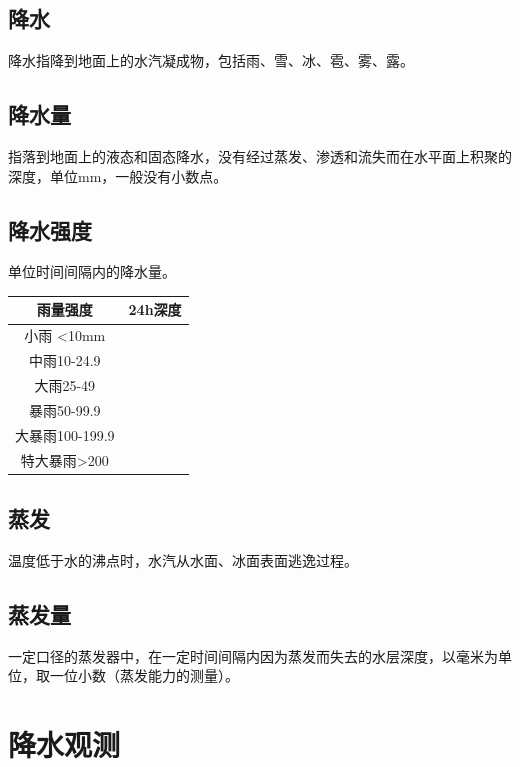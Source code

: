 \documentclass[UTF8,11pt]{ctexbook}
\begin{document}
\subsection{降水}

降水指降到地面上的水汽凝成物，包括雨、雪、冰、雹、雾、露。

\subsection{降水量}

指落到地面上的液态和固态降水，没有经过蒸发、渗透和流失而在水平面上积聚的深度，单位mm，一般没有小数点。

\subsection{降水强度}

单位时间间隔内的降水量。
\begin{table}[htbp]
    \centering
    \begin{tabular}{cc}
        \toprule
        雨量强度 & 24h深度\\
        \midrule
        小雨 <10mm\\
        中雨10-24.9\\
        大雨25-49\\
        暴雨50-99.9\\
        大暴雨100-199.9\\
        特大暴雨>200\\
        \bottomrule
    \end{tabular}
\end{table}

\subsection{蒸发}

温度低于水的沸点时，水汽从水面、冰面表面逃逸过程。

\subsection{蒸发量}

一定口径的蒸发器中，在一定时间间隔内因为蒸发而失去的水层深度，以毫米为单位，取一位小数（蒸发能力的测量）。

\section{降水观测}
\end{document}
